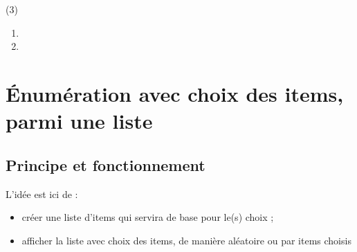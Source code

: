 \documentclass[french,11pt,a4paper]{article}
\begin{document}
\begin{DemoCode}{}
\lipsum[1][1-2]

\begin{MultiCols}[CoeffEspVert=0.25,EpTrait=1pt](3)
    \lipsum[2]
\end{MultiCols}

\lipsum[1][3-4]
\end{DemoCode}

\begin{DemoCode}{}
\begin{enumerate}
    \item \lipsum[1][1-2]
    \item \lipsum[1][3-4]
\end{enumerate}

\lipsum[3][1]
\end{DemoCode}

\pagebreak

\section{Énumération avec choix des items, parmi une liste}

\subsection{Principe et fonctionnement}

L'idée est ici de :

\begin{itemize}
	\item créer une liste d'items qui servira de base pour le(s) choix ;
	\item afficher la liste avec choix des items, de manière aléatoire ou par items choisis
\end{itemize}
\end{document}

